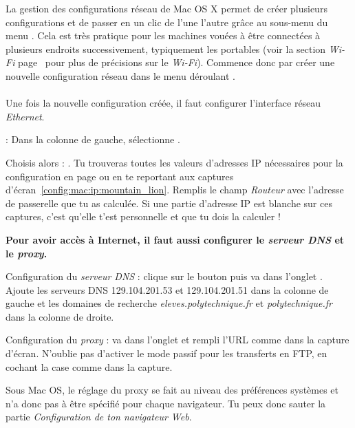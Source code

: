 
La gestion des configurations r\'eseau de Mac OS X permet de cr\'eer plusieurs configurations et de passer en un clic de l'une  l'autre gr\^ace au sous-menu  du menu . Cela est tr\`es pratique pour les machines vou\'ees \`a  \^etre connect\'ees \`a  plusieurs endroits successivement, typiquement les portables (voir la section \emph{Wi-Fi} page~\pageref{wifi} pour plus de pr\'ecisions sur le \emph{Wi-Fi}). Commence donc par cr\'eer une nouvelle configuration r\'eseau dans le menu d\'eroulant .
\\
\\
Une fois la nouvelle configuration cr\'e\'ee, il faut configurer l'interface r\'eseau \emph{Ethernet}.


 : Dans la colonne de gauche, s\'electionne .

Choisis alors  : . Tu trouveras toutes les valeurs d'adresses IP n\'ecessaires pour la configuration en page \pageref{calcul_ip} ou en te reportant aux captures d'\'ecran~\ref{config:mac:ip:mountain_lion}. Remplis le champ \emph{Routeur} avec l'adresse de passerelle que tu as calcul\'ee. Si une partie d'adresse IP est blanche sur ces captures, c'est qu'elle t'est personnelle et que tu dois la calculer !


  
  

\vspace{4mm}

\textbf{Pour avoir acc\`es \`a  Internet, il faut aussi configurer le \emph{serveur DNS} et le \emph{proxy}.}

Configuration du \emph{serveur DNS} : clique sur le bouton  puis va dans l'onglet . Ajoute les serveurs DNS 129.104.201.53 et 129.104.201.51 dans la colonne de gauche et les domaines de recherche \emph{eleves.polytechnique.fr} et \emph{polytechnique.fr} dans la colonne de droite.



Configuration du \emph{proxy} : va dans l'onglet  et rempli l'URL comme dans la capture d'\'ecran. N'oublie pas d'activer le mode passif pour les transferts en FTP, en cochant la case comme dans la capture.

Sous Mac OS, le r\'eglage du proxy se fait au niveau des pr\'ef\'erences syst\`emes et n'a donc pas \`a \^etre sp\'ecifi\'e pour chaque navigateur. Tu peux donc sauter la partie \emph{Configuration de ton navigateur Web}.



